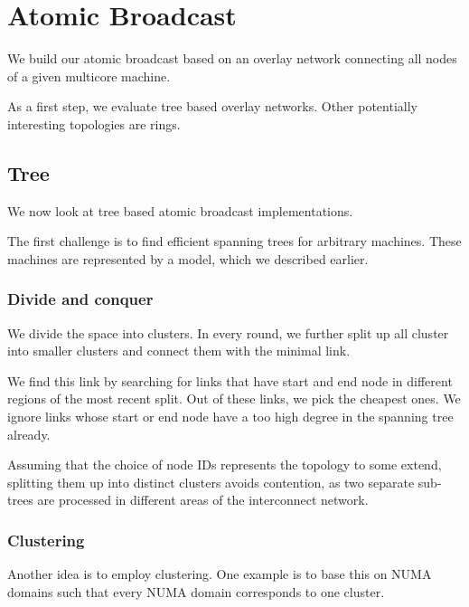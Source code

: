 \documentclass{article}
\begin{document}
\section{Atomic Broadcast}

We build our atomic broadcast based on an overlay network connecting
all nodes of a given multicore machine. 

As a first step, we evaluate tree based overlay networks. Other
potentially interesting topologies are rings.

\subsection{Tree}

We now look at tree based atomic broadcast implementations. 

The first challenge is to find efficient spanning trees for arbitrary
machines. These machines are represented by a model, which we
described earlier.

\subsubsection{Divide and conquer}

We divide the space into clusters. In every round, we further split up
all cluster into smaller clusters and connect them with the minimal
link. 

We find this link by searching for links that have start and
end node in different regions of the most recent split. Out of these
links, we pick the cheapest ones. We ignore links whose start or end
node have a too high degree in the spanning tree already.

Assuming that the choice of node IDs represents the topology to some
extend, splitting them up into distinct clusters avoids contention, as
two separate sub-trees are processed in different areas of the
interconnect network.

\subsubsection{Clustering}

Another idea is to employ clustering. One example is to base this on
NUMA domains such that every NUMA domain corresponds to one cluster. 
\end{document}
